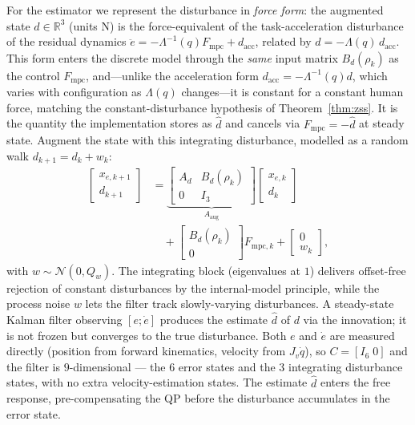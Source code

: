 \documentclass[journal]{IEEEtran}
\newcommand{\Laminv}{\Lambda^{-1}(q)}
\newcommand{\Fmpc}{F_{\text{mpc}}}
\newcommand{\Fmpck}[1]{F_{\text{mpc},#1}}
\newcommand{\dhat}{\hat{d}}
\begin{document}
For the estimator we represent the disturbance in \emph{force form}: the
augmented state $d\in\mathbb{R}^3$ (units N) is the force-equivalent of the
task-acceleration disturbance of the residual dynamics
$\ddot{e}=-\Laminv\Fmpc+d_{\text{acc}}$, related by $d=-\Lambda(q)\,d_{\text{acc}}$.
This form enters the discrete model through the \emph{same} input matrix
$B_d(\rho_k)$ as the control $\Fmpc$, and---unlike the acceleration form
$d_{\text{acc}}=-\Lambda^{-1}(q)d$, which varies with configuration as
$\Lambda(q)$ changes---it is constant for a constant human force, matching the
constant-disturbance hypothesis of Theorem~\ref{thm:zss}. It is the quantity
the implementation stores as $\dhat$ and cancels via $\Fmpc=-\dhat$ at steady
state. Augment the state with this integrating disturbance, modelled as a
random walk $d_{k+1}=d_k+w_k$:
\begin{equation}\label{eq:augstate}
\begin{aligned}
  \begin{bmatrix}x_{e,k+1}\\d_{k+1}\end{bmatrix}
  &= \underbrace{\begin{bmatrix}A_d&B_d(\rho_k)\\0&I_3\end{bmatrix}}_{A_{\text{aug}}}
    \begin{bmatrix}x_{e,k}\\d_k\end{bmatrix}\\[2pt]
  &\quad + \begin{bmatrix}B_d(\rho_k)\\0\end{bmatrix}\Fmpck{k}
  + \begin{bmatrix}0\\w_k\end{bmatrix},
\end{aligned}
\end{equation}
with $w\sim\mathcal{N}(0,Q_w)$.
The integrating block (eigenvalues at $1$) delivers offset-free
rejection of constant disturbances by the internal-model principle,
while the process noise $w$ lets the filter track slowly-varying
disturbances. A steady-state Kalman filter observing $[e;\dot{e}]$
produces the estimate $\dhat$ of $d$ via the innovation; it is not
frozen but converges to the true disturbance. Both $e$ and $\dot e$ are
measured directly (position from forward kinematics, velocity from
$J_v\dot q$), so $C=[I_6\;0]$ and the filter is $9$-dimensional --- the
$6$ error states and the $3$ integrating disturbance states, with no
extra velocity-estimation states. The estimate $\dhat$
enters the free response, pre-compensating the QP before the disturbance
accumulates in the error state.
\end{document}
